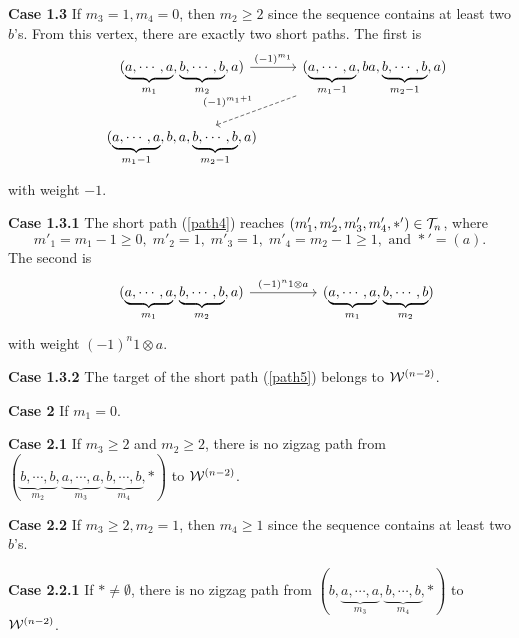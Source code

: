 \documentclass[10pt, reqno]{amsart}
\theoremstyle{definition}
\theoremstyle{remark}
\numberwithin{equation}{section}
\begin{document}
\noindent \hspace*{2em}\textbf{Case 1.3} If \(m_3=1, m_4 =0\), then \(m_2 \ge 2\) since the sequence contains at least two \(b\)'s. From this vertex, there are exactly two short paths. The first  is
\begin{equation} \label{path4}
    \begin{tikzcd}
   & (\underbrace{a, \cdots,a}_{m_1}, \underbrace{b, \cdots,b}_{m_2}, a) \arrow[r,"(-1)^{m_1}"] & (\underbrace{a, \cdots,a}_{m_1-1}, ba, \underbrace{b, \cdots,b}_{m_2-1}, a) \arrow[ld,dashed,"(-1)^{m_1+1}",swap] \\
   & (\underbrace{a, \cdots,a}_{m_1-1}, b, a, \underbrace{b, \cdots,b}_{m_2-1}, a)   
        \end{tikzcd}
\end{equation}
with weight $-1$.

\noindent \hspace*{4em}\textbf{Case 1.3.1} The short path (\ref{path4}) reaches \((m'_1, m'_2, m'_3, m'_4, *') \in \mathcal{T}_n\),  where
\begin{equation}
    m'_1= m_1-1 \ge 0,\;  m'_2= 1,\;  m'_3=1,\;  m'_4 =m_2-1\ge 1, \text{ and } *'=(a).
\end{equation}
The second is
\begin{equation} \label{path5}
    \begin{tikzcd}
   & (\underbrace{a, \cdots,a}_{m_1}, \underbrace{b, \cdots,b}_{m_2}, a) \arrow[rr,"(-1)^{n} 1 \otimes a"] && (\underbrace{a, \cdots,a}_{m_1}, \underbrace{b, \cdots,b}_{m_2})  
        \end{tikzcd}
\end{equation}
with weight $(-1)^{n} 1 \otimes a$.

\noindent \hspace*{4em}\textbf{Case 1.3.2} The target of the short path (\ref{path5}) belongs to \(\mathcal{W}^{(n-2)}\). 

\noindent \textbf{Case 2} If \(m_1 =0\).

\noindent \hspace*{2em}\textbf{Case 2.1} If \(m_3\ge 2\) and \(m_2 \ge 2\), there is no zigzag path from \((\underbrace{b, \cdots,b}_{m_2}, \underbrace{a, \cdots,a}_{m_3}, \underbrace{b, \cdots,b}_{m_4},*)\) to \(\mathcal{W}^{(n-2)}\).

\noindent \hspace*{2em}\textbf{Case 2.2} If \(m_3\ge 2, m_2 =1\), then \(m_4 \ge 1\)  since the sequence contains at least two \(b\)'s.

\noindent \hspace*{4em}\textbf{Case 2.2.1} If \(*\neq \emptyset\), there is no zigzag path from \(( b, \underbrace{a, \cdots,a}_{m_3}, \underbrace{b, \cdots,b}_{m_4},*)\) to \(\mathcal{W}^{(n-2)}\).
\end{document}

